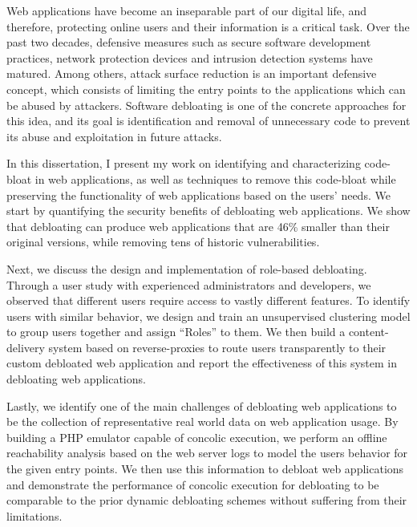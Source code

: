 Web applications have become an inseparable part of our digital life, and therefore, protecting online users and their information is a critical task. 
Over the past two decades, defensive measures such as secure software development practices, network protection devices and intrusion detection systems have matured. 
Among others, attack surface reduction is an important defensive concept, which consists of limiting the entry points to the applications which can be abused by attackers. 
Software debloating is one of the concrete approaches for this idea, and its goal is identification and removal of unnecessary code to prevent its abuse and exploitation in future attacks. 

In this dissertation, I present my work on identifying and characterizing code-bloat in web applications, as well as techniques to remove this code-bloat while preserving the functionality of web applications based on the users' needs.
We start by quantifying the security benefits of debloating web applications. We show that debloating can produce web applications that are 46\% smaller than their original versions, while removing tens of historic vulnerabilities. 

Next, we discuss the design and implementation of role-based debloating.
Through a user study with experienced administrators and developers, we observed that different users require access to vastly different features.
To identify users with similar behavior, we design and train an unsupervised clustering model to group users together and assign ``Roles'' to them. 
We then build a content-delivery system based on reverse-proxies to route users transparently to their custom debloated web application and report the effectiveness of this system in debloating web applications. 

Lastly, we identify one of the main challenges of debloating web applications to be the collection of representative real world data on web application usage. By building a PHP emulator capable of concolic execution, we perform an offline reachability analysis based on the web server logs to model the users behavior for the given entry points. We then use this information to debloat web applications and demonstrate the performance of concolic execution for debloating to be comparable to the prior dynamic debloating schemes without suffering from their limitations.